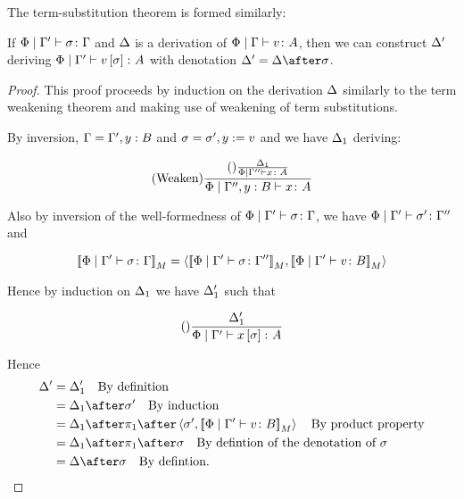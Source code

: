 \documentclass{Report}
\begin{document}
The term-substitution theorem is formed similarly: 

\begin{theorem}
    If $\Phi\mid\Gamma' \vdash \sigma \colon \Gamma$ and $\Delta$ is a derivation of $\Phi\mid\Gamma \vdash v \colon A$, then we can construct $\Delta'$ deriving $\Phi\mid\Gamma' \vdash v\left[\sigma\right] \colon A$ with denotation $\D' = \D \after \si$.
\end{theorem}


\begin{proof}
    This proof proceeds by induction on the derivation $\Delta$ similarly to the term weakening theorem and making use of weakening of term substitutions.



By inversion, $\Gamma = \Gamma', y:B$ and $\sigma = \sigma', y:= v$
and we have $\Delta_1$ deriving:

\begin{equation}
    (\text{Weaken}) \frac{(\text{}) \frac{\Delta_1}{\Phi\mid\Gamma'' \vdash x \colon A}}{\Phi\mid\Gamma'',y: B \vdash x \colon A}
\end{equation}

Also by inversion of the well-formedness of $\Phi\mid\Gamma' \vdash \sigma \colon \Gamma$, we have $\Phi\mid\Gamma' \vdash \sigma' \colon \Gamma''$ and 

\begin{equation}
    {\bf [\![}\Phi\mid\Gamma' \vdash \sigma \colon \Gamma{\bf ]\!]}_M = \left\langle{\bf [\![}\Phi\mid\Gamma' \vdash \sigma \colon \Gamma''{\bf ]\!]}_M, {\bf [\![}\Phi\mid\Gamma' \vdash v \colon B{\bf ]\!]}_M\right\rangle
\end{equation}

Hence by induction on $\Delta_1$ we have $\Delta_1'$ such that

\begin{equation}
    (\text{}) \frac{\Delta_1'}{\Phi\mid\Gamma' \vdash x\left[\sigma\right] \colon A}
\end{equation}



Hence
\begin{align}
    \D' & = \D_1' \qt{By definition}\\
        & = \D_1\after\si'\qt{By induction}\\
        & = \D_1\after\p\after\pr{\si'}{\deno{\etyperelation{\P}{\G'}{v}{B}}}\qt{By product property}\\
        & = \D_1\after\p\after\si\qt{By defintion of the denotation of $\si$}\\
        & = \D\after\si\qt{By defintion.}
\end{align}



\end{proof}
\end{document}
